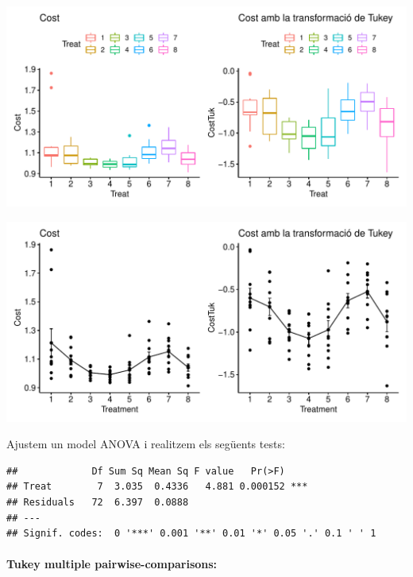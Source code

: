 \documentclass[11pt,a4paper]{article}\usepackage[]{graphicx}\usepackage[]{color}
\makeatletter
\def\maxwidth{ %
  \ifdim\Gin@nat@width>\linewidth
    \linewidth
  \else
    \Gin@nat@width
  \fi
}
\newenvironment{kframe}{%
 \def\at@end@of@kframe{}%
 \ifinner\ifhmode%
  \def\at@end@of@kframe{\end{minipage}}%
  \begin{minipage}{\columnwidth}%
 \fi\fi%
 \def\FrameCommand##1{\hskip\@totalleftmargin \hskip-\fboxsep
 \colorbox{shadecolor}{##1}\hskip-\fboxsep
     \hskip-\linewidth \hskip-\@totalleftmargin \hskip\columnwidth}%
 \MakeFramed {\advance\hsize-\width
   \@totalleftmargin\z@ \linewidth\hsize
   \@setminipage}}%
 {\par\unskip\endMakeFramed%
 \at@end@of@kframe}
\newenvironment{knitrout}{}{} %
\makeatother
\begin{document}
\begin{knitrout}
\color{fgcolor}
\includegraphics[width=\maxwidth]{figure/unnamed-chunk-20-1} 

\includegraphics[width=\maxwidth]{figure/unnamed-chunk-20-2} 

\end{knitrout}

Ajustem un model ANOVA i realitzem els següents tests:
\begin{knitrout}
\color{fgcolor}\begin{kframe}
\begin{verbatim}
##             Df Sum Sq Mean Sq F value   Pr(>F)    
## Treat        7  3.035  0.4336   4.881 0.000152 ***
## Residuals   72  6.397  0.0888                     
## ---
## Signif. codes:  0 '***' 0.001 '**' 0.01 '*' 0.05 '.' 0.1 ' ' 1
\end{verbatim}
\end{kframe}
\end{knitrout}


\paragraph{Tukey multiple pairwise-comparisons:}
\end{document}
